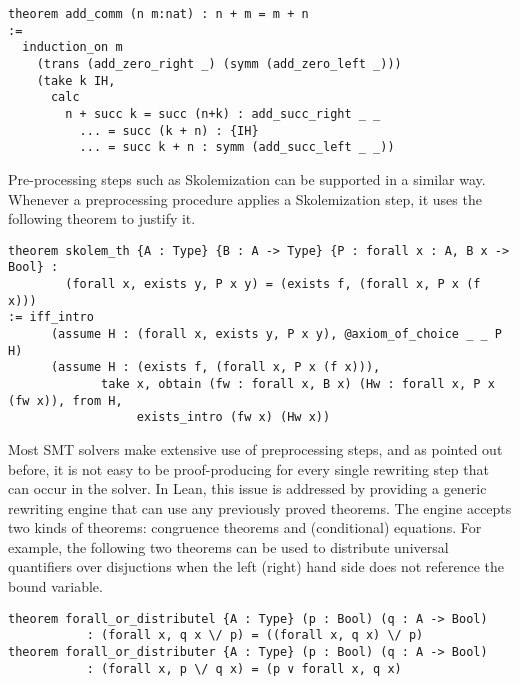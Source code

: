 \documentclass{llncs}
\begin{document}
{\scriptsize
\begin{verbatim}
theorem add_comm (n m:nat) : n + m = m + n
:=
  induction_on m
    (trans (add_zero_right _) (symm (add_zero_left _)))
    (take k IH,
      calc
        n + succ k = succ (n+k) : add_succ_right _ _
          ... = succ (k + n) : {IH}
          ... = succ k + n : symm (add_succ_left _ _))
\end{verbatim}
}

Pre-processing steps such as Skolemization can be supported in
a similar way. Whenever a preprocessing procedure applies a
Skolemization step, it uses the following theorem to justify it.

{\scriptsize
\begin{verbatim}
theorem skolem_th {A : Type} {B : A -> Type} {P : forall x : A, B x -> Bool} :
        (forall x, exists y, P x y) = (exists f, (forall x, P x (f x)))
:= iff_intro
      (assume H : (forall x, exists y, P x y), @axiom_of_choice _ _ P H)
      (assume H : (exists f, (forall x, P x (f x))),
             take x, obtain (fw : forall x, B x) (Hw : forall x, P x (fw x)), from H,
                  exists_intro (fw x) (Hw x))
\end{verbatim}
}

Most SMT solvers make extensive use of preprocessing steps, and as
pointed out before, it is not easy to be proof-producing for every
single rewriting step that can occur in the solver.
In Lean, this issue is addressed by providing a generic rewriting
engine that can use any previously proved theorems. The engine
accepts two kinds of theorems: congruence theorems and (conditional)
equations. For example, the following two theorems can be used to
distribute universal quantifiers over disjuctions when the left
(right) hand side does not reference the bound variable.

{\scriptsize
\begin{verbatim}
theorem forall_or_distributel {A : Type} (p : Bool) (q : A -> Bool)
           : (forall x, q x \/ p) = ((forall x, q x) \/ p)
theorem forall_or_distributer {A : Type} (p : Bool) (q : A -> Bool)
           : (forall x, p \/ q x) = (p ∨ forall x, q x)
\end{verbatim}
}


\end{document}
